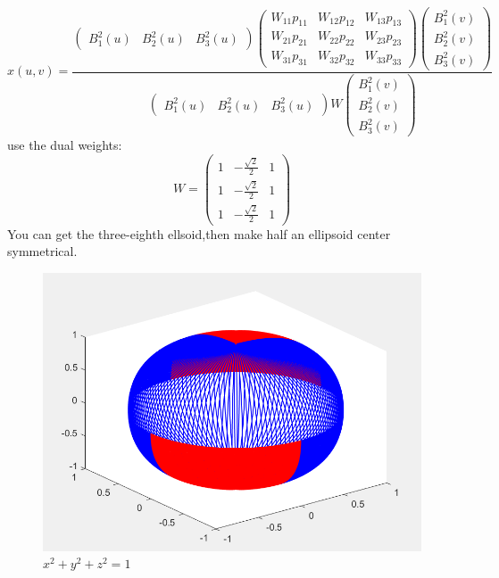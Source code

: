 \documentclass{article}
\begin{document}
	\begin{equation*}
		x(u,v) = 
		\frac{\left(
		\begin{matrix}
			B_1^2(u)&B_2^2(u)&B_3^2(u)
		\end{matrix}
		\right)
		\left(
		\begin{matrix}
			W_{11}p_{11}&W_{12}p_{12}&W_{13}p_{13}\\
			W_{21}p_{21}&W_{22}p_{22}&W_{23}p_{23}\\
			W_{31}p_{31}&W_{32}p_{32}&W_{33}p_{33}
		\end{matrix}
		\right)
		\left(
		\begin{matrix}
			B_1^2(v)\\
			B_2^2(v)\\
			B_3^2(v)
		\end{matrix}
		\right)}
	{\left(
		\begin{matrix}
			B_1^2(u)&B_2^2(u)&B_3^2(u)
		\end{matrix}
		\right)
		W
		\left(
		\begin{matrix}
			B_1^2(v)\\
			B_2^2(v)\\
			B_3^2(v)
		\end{matrix}
		\right)}
	\end{equation*}
	use the dual weights:
	\begin{equation*}
		W = \left(
		\begin{matrix}
			1&-\frac{\sqrt{2}}{2}& 1\\
			1&-\frac{\sqrt{2}}{2}& 1\\
			1&-\frac{\sqrt{2}}{2}& 1
		\end{matrix}
		\right)
	\end{equation*}
	You can get the three-eighth ellsoid,then make half an ellipsoid center symmetrical.
	\begin{figure}[H]
		\centering
		\includegraphics[scale=0.6]{1}
		\caption{$x^2+y^2+z^2=1$}
		\label{fig:1}
	\end{figure}
	
\end{document}
